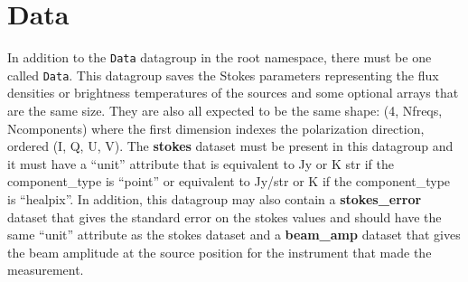 \documentclass[11pt, oneside]{article}
\begin{document}
\section{Data}
\label{sec:data}
In addition to the \texttt{Data} datagroup in the root namespace, there must be
one called \texttt{Data}. This datagroup saves the Stokes parameters representing
the flux densities or brightness temperatures of the sources and some optional
arrays that are the same size. They are also all expected to be the same shape:
(4, Nfreqs, Ncomponents) where the first dimension indexes the polarization
direction, ordered (I, Q, U, V). The \textbf{stokes} dataset must be present in this
datagroup and it must have a ``unit'' attribute that is equivalent to Jy or K str if the
component\_type is ``point'' or equivalent to Jy/str or K if the component\_type is
``healpix''. In addition, this datagroup may also contain a  \textbf{stokes\_error}
dataset that gives the standard error on the stokes values and should have the
same ``unit'' attribute as the stokes dataset and a  \textbf{beam\_amp} dataset
that gives the beam amplitude at the source position for the instrument that made
the measurement.
\end{document}
